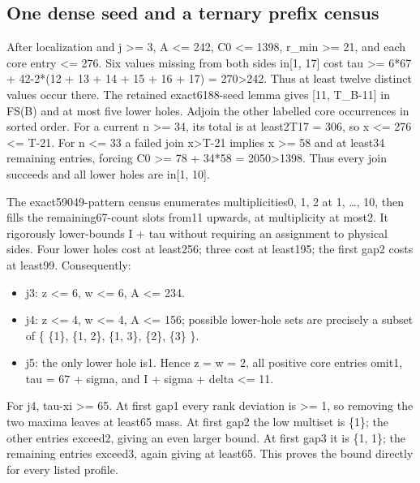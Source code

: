 \documentclass[11pt,a4paper]{article}
\newcommand{\tightlist}{\setlength{\itemsep}{0pt}\setlength{\parskip}{0pt}}
\begin{document}
\hypertarget{one-dense-seed-and-a-ternary-prefix-census}{%
\subsection{One dense seed and a ternary prefix
census}\label{one-dense-seed-and-a-ternary-prefix-census}}

After localization and j \textgreater= 3, A \textless= 242, C0
\textless= 1398, r\_min \textgreater= 21, and each core entry \textless=
276. Six values missing from both sides in{[}1, 17{]} cost tau
\textgreater= 6*67 + 42-2*(12 + 13 + 14 + 15 + 16 + 17) =
270\textgreater242. Thus at least twelve distinct values occur there.
The retained exact6188-seed lemma gives {[}11, T\_B-11{]} in FS(B) and
at most five lower holes. Adjoin the other labelled core occurrences in
sorted order. For a current n \textgreater= 34, its total is at
least2T17 = 306, so x \textless= 276 \textless= T-21. For n \textless=
33 a failed join x\textgreater T-21 implies x \textgreater= 58 and at
least34 remaining entries, forcing C0 \textgreater= 78 + 34*58 =
2050\textgreater1398. Thus every join succeeds and all lower holes are
in{[}1, 10{]}.

The exact59049-pattern census enumerates multiplicities0, 1, 2 at 1,
\ldots, 10, then fills the remaining67-count slots from11 upwards, at
multiplicity at most2. It rigorously lower-bounds I + tau without
requiring an assignment to physical sides. Four lower holes cost at
least256; three cost at least195; the first gap2 costs at least99.
Consequently:

\begin{itemize}
\tightlist
\item
  j3: z \textless= 6, w \textless= 6, A \textless= 234.
\item
  j4: z \textless= 4, w \textless= 4, A \textless= 156; possible
  lower-hole sets are precisely a subset of \{ \{1\}, \{1, 2\}, \{1,
  3\}, \{2\}, \{3\} \}.
\item
  j5: the only lower hole is1. Hence z = w = 2, all positive core
  entries omit1, tau = 67 + sigma, and I + sigma + delta \textless= 11.
\end{itemize}

For j4, tau-xi \textgreater= 65. At first gap1 every rank deviation is
\textgreater= 1, so removing the two maxima leaves at least65 mass. At
first gap2 the low multiset is \{1\}; the other entries exceed2, giving
an even larger bound. At first gap3 it is \{1, 1\}; the remaining
entries exceed3, again giving at least65. This proves the bound directly
for every listed profile.
\end{document}

